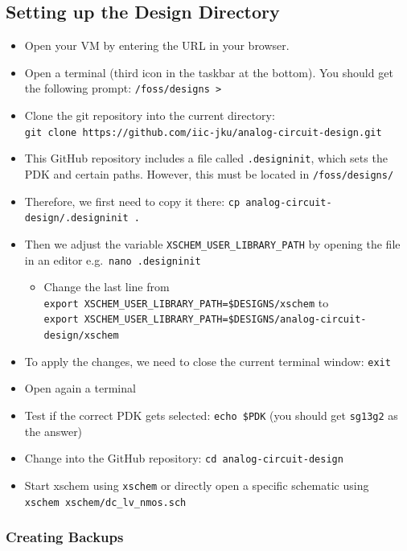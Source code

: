 \documentclass[
  a4paper,
  DIV=11,
  numbers=noendperiod]{scrartcl}
\providecommand{\tightlist}{%
  \setlength{\itemsep}{0pt}\setlength{\parskip}{0pt}}\usepackage{longtable,booktabs,array}
\begin{document}
\subsection{Setting up the Design
Directory}\label{setting-up-the-design-directory}

\begin{itemize}
\tightlist
\item
  Open your VM by entering the URL in your browser.
\item
  Open a terminal (third icon in the taskbar at the bottom). You should
  get the following prompt: \texttt{/foss/designs\ \textgreater{}}
\item
  Clone the git repository into the current directory:
  \texttt{git\ clone\ https://github.com/iic-jku/analog-circuit-design.git}
\item
  This GitHub repository includes a file called \texttt{.designinit},
  which sets the PDK and certain paths. However, this must be located in
  \texttt{/foss/designs/}
\item
  Therefore, we first need to copy it there:
  \texttt{cp\ analog-circuit-design/.designinit\ .}
\item
  Then we adjust the variable \texttt{XSCHEM\_USER\_LIBRARY\_PATH} by
  opening the file in an editor e.g.~\texttt{nano\ .designinit}

  \begin{itemize}
  \tightlist
  \item
    Change the last line from
    \texttt{export\ XSCHEM\_USER\_LIBRARY\_PATH=\$DESIGNS/xschem} to
    \texttt{export\ XSCHEM\_USER\_LIBRARY\_PATH=\$DESIGNS/analog-circuit-design/xschem}
  \end{itemize}
\item
  To apply the changes, we need to close the current terminal window:
  \texttt{exit}
\item
  Open again a terminal
\item
  Test if the correct PDK gets selected: \texttt{echo\ \$PDK} (you
  should get \texttt{sg13g2} as the answer)
\item
  Change into the GitHub repository: \texttt{cd\ analog-circuit-design}
\item
  Start xschem using \texttt{xschem} or directly open a specific
  schematic using \texttt{xschem\ xschem/dc\_lv\_nmos.sch}
\end{itemize}

\subsubsection{Creating Backups}\label{creating-backups}
\end{document}
